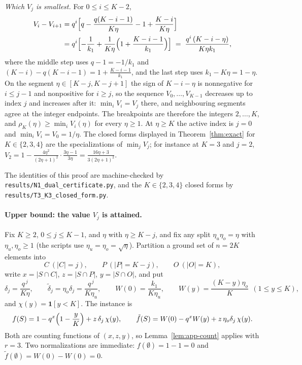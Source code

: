 \emph{Which $V_j$ is smallest.}  For $0\le i\le K-2$,
\begin{align*}
  V_i-V_{i+1}
  &=q^{i}\Bigl[q-\frac{q(K-i-1)}{K\eta}-1+\frac{K-i}{K\eta}\Bigr]\\
  &=q^{i}\Bigl[-\frac1{k_1}+\frac{1}{K\eta}
    \Bigl(1+\frac{K-i-1}{k_1}\Bigr)\Bigr]
  \;=\;\frac{q^{i}\,(K-i-\eta)}{K\eta k_1},
\end{align*}
where the middle step uses $q-1=-1/k_1$ and
$(K-i)-q(K-i-1)=1+\frac{K-i-1}{k_1}$, and the last step uses
$k_1-K\eta=1-\eta$.  On the segment $\eta\in[K-j,K-j+1]$ the sign of
$K-i-\eta$ is nonnegative for $i\le j-1$ and nonpositive for $i\ge j$, so the
sequence $V_0,\dots,V_{K-1}$ decreases up to index $j$ and increases after it:
$\min_iV_i=V_j$ there, and neighbouring segments agree at the integer
endpoints.  The breakpoints are therefore the integers $2,\dots,K$, and
$\rho_K(\eta)\ge\min_iV_i(\eta)$ for every $\eta\ge1$.  At $\eta\ge K$ the
active index is $j=0$ and $\min_iV_i=V_0=1/\eta$.
The closed forms displayed in Theorem~\ref{thm:exact} for $K\in\{2,3,4\}$ are
the specializations of $\min_jV_j$; for instance at $K=3$ and $j=2$,
$V_2=1-\frac{4\eta^{2}}{(2\eta+1)^{2}}\cdot\frac{3\eta-1}{3\eta}
=\frac{16\eta+3}{3(2\eta+1)^{2}}$.

The identities of this proof are machine-checked by
\texttt{results/N1\_dual\_certificate.py}, and the $K\in\{2,3,4\}$ closed forms
by \texttt{results/T3\_K3\_closed\_form.py}.

\paragraph{Upper bound: the value $V_j$ is attained.}
Fix $K\ge2$, $0\le j\le K-1$, and $\eta$ with $\eta\ge K-j$, and fix any split
$\eta_u\eta_o=\eta$ with $\eta_u,\eta_o\ge1$ (the scripts use
$\eta_u=\eta_o=\sqrt\eta$).  Partition a ground set of $n=2K$ elements into
\[
  C\ (|C|=j),\qquad P\ (|P|=K-j),\qquad O\ (|O|=K),
\]
write $x=|S\cap C|$, $z=|S\cap P|$, $y=|S\cap O|$, and put
\[
  \delta_j=\frac{q^{\,j}}{K\eta},\qquad
  \tilde\delta_j=\eta_o\delta_j=\frac{q^{\,j}}{K\eta_u},\qquad
  W(0)=\frac{k_1}{K\eta_u},\qquad
  W(y)=\frac{(K-y)\eta_o}{K}\ \ (1\le y\le K),
\]
and $\chi(y)=\mathbf 1[y<K]$.  The instance is
\begin{equation}\label{eq:vj-family}
  f(S)=1-q^{x}\Bigl(1-\frac yK\Bigr)+z\,\delta_j\,\chi(y),
  \qquad
  \tilde f(S)=W(0)-q^{x}W(y)+z\,\eta_o\delta_j\,\chi(y).
\end{equation}
Both are counting functions of $(x,z,y)$, so Lemma~\ref{lem:app-count} applies
with $r=3$.  Two normalizations are immediate: $f(\emptyset)=1-1=0$ and
$\tilde f(\emptyset)=W(0)-W(0)=0$.

